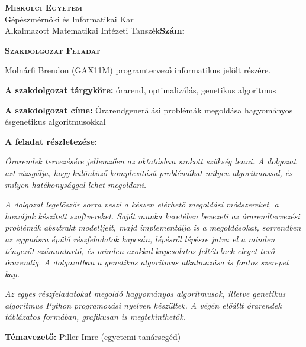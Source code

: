 \documentclass[12pt,a4paper]{report}
\begin{document}
\newpage

\pagestyle{empty}
\begin{flushleft}
\textsc{\bfseries Miskolci Egyetem}\\
Gépészmérnöki és Informatikai Kar\\
Alkalmazott Matematikai Intézeti Tanszék\hspace*{4cm}\hfil \textbf{Szám:}
\end{flushleft}
\vskip 0.5cm
\begin{center}
\large\textsc{\bfseries Szakdolgozat Feladat}
\end{center}
\vskip 0.5cm
Molnárfi Brendon (GAX11M) programtervező informatikus jelölt részére.\newline

\noindent\textbf{A szakdolgozat tárgyköre:} órarend, optimalizálás, genetikus algoritmus\newline

\noindent\textbf{A szakdolgozat címe:} Órarendgenerálási problémák megoldása hagyományos és\newline genetikus algoritmusokkal\newline

\noindent\textbf{A feladat részletezése:}

\medskip

\emph{Órarendek tervezésére jellemzően az oktatásban szokott szükség lenni. A dolgozat azt vizsgálja, hogy különböző komplexitású problémákat milyen algoritmussal, és milyen hatékonysággal lehet megoldani.}

\medskip

\emph{A dolgozat legelőször sorra veszi a készen elérhető megoldási módszereket, a hozzájuk készített szoftvereket. Saját munka keretében bevezeti az órarendtervezési problémák absztrakt modelljeit, majd implementálja is a megoldásokat, sorrendben az egymásra épülő részfeladatok kapcsán, lépésről lépésre jutva el a minden tényezőt számontartó, és minden azokkal kapcsolatos feltételnek eleget tevő órarendig. A dolgozatban a genetikus algoritmus alkalmazása is fontos szerepet kap.}

\medskip

\emph{Az egyes részfeladatokat megoldó hagyományos algoritmusok, illetve genetikus algoritmus Python programozási nyelven készültek. A végén előállt órarendek táblázatos formában, grafikusan is megtekinthetők.}

\vfill

\noindent\textbf{Témavezető:} Piller Imre (egyetemi tanársegéd) \newline
\end{document}
